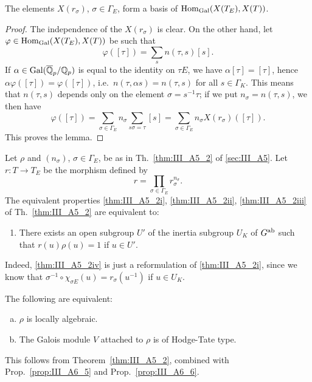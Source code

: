 \begin{subappendices}
\begin{lem}
	The elements $X(r_\sigma)$, $\sigma \in \Gamma_E$,
	\dpage
	form a basis of $\Hom_{\Gal}(X(T_E),\break X(T))$.
\end{lem}
\begin{proof}
	The independence of the $X(r_\sigma)$ is clear. On the other hand,
	let $\varphi \in \operatorname{Hom}_{\operatorname{Gal}}(X(T_E),X(T))$ be such that
	\[
		\varphi([\tau]) = \sum_{s} n(\tau, s)[s].
	\]
	If $\alpha \in \operatorname{Gal}(\overline{\mathbb{Q}}_p/\mathbb{Q}_p)$ is equal to the identity on $\tau
	E$, we have $\alpha[\tau] = [\tau]$, hence $\alpha \varphi([\tau]) =
	\varphi([\tau])$, i.e.\ $n(\tau, \alpha s) = n(\tau, s)$ for all $s \in
	\Gamma_K$. This means that $n(\tau, s)$ depends only on the element
	$\sigma = s^{-1} \tau$; if we put $n_\sigma = n(\tau, s)$, we then have
	\[
		\varphi([\tau]) = \sum_{\sigma \in \Gamma_E} n_\sigma
		\sum_{s\sigma = \tau} [s]
		= \sum_{\sigma \in \Gamma_E} n_\sigma X(r_\sigma)([\tau]).
	\]
	This proves the lemma.
\end{proof}

\begin{prop}\label{prop:III_A6_6}
	Let $\rho$ and $(n_\sigma)$, $\sigma \in \Gamma_E$, be as in
	Th.~\ref{thm:III_A5_2} of \ref{sec:III_A5}.  Let $r\colon T \to T_E$ be
	the morphism defined by
	\[
		r = \prod_{\sigma \in \Gamma_E} r_\sigma^{n_\sigma}.
	\]
	The equivalent properties \ref{thm:III_A5_2i}, \ref{thm:III_A5_2ii},
	\ref{thm:III_A5_2iii} of Th.~\ref{thm:III_A5_2} are equivalent to:
	\begin{enumerate}[resume*=thm_IIIA5_2]
	\item\label{thm:III_A5_2iv}
		There exists an open subgroup $U'$ of the inertia subgroup
		$U_K$ of $G^{\mathrm{ab}}$ such that $r(u) \rho(u) = 1$ if $u \in U'$.
	\end{enumerate}
\end{prop}
Indeed, \ref{thm:III_A5_2iv} is just a reformulation of \ref{thm:III_A5_2i},
since we know that $\sigma^{-1} \circ \chi_{\sigma E}(u) = r_\sigma(u^{-1})$ if
$u \in U_K$.

\begin{corp}
	The following are equivalent:
	\begin{enumerate}[(a)]
	\item $\rho$ is locally algebraic.
	\item The Galois module $V$ attached to $\rho$ is of Hodge-Tate type.
	\end{enumerate}
\end{corp}
This follows from Theorem~\ref{thm:III_A5_2}, combined with
Prop.~\ref{prop:III_A6_5} and Prop.~\ref{prop:III_A6_6}.


\end{subappendices}

